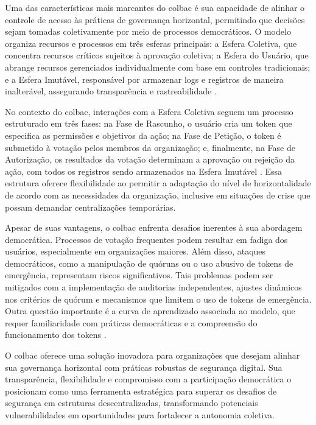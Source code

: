 Uma das características mais marcantes do \gls{colbac} é sua capacidade de
alinhar o controle de acesso às práticas de governança horizontal,
permitindo que decisões sejam tomadas coletivamente por meio de
processos democráticos. O modelo organiza recursos e processos em três
esferas principais: a Esfera Coletiva, que concentra recursos críticos
sujeitos à aprovação coletiva; a Esfera do Usuário, que abrange
recursos gerenciados individualmente com base em controles
tradicionais; e a Esfera Imutável, responsável por armazenar logs e
registros de maneira inalterável, assegurando transparência e
rastreabilidade \cite{Colbac}.

No contexto do \gls{colbac}, interações com a Esfera Coletiva seguem um
processo estruturado em três fases: na Fase de Rascunho, o usuário
cria um token que especifica as permissões e objetivos da ação; na
Fase de Petição, o token é submetido à votação pelos membros da
organização; e, finalmente, na Fase de Autorização, os resultados da
votação determinam a aprovação ou rejeição da ação, com todos os
registros sendo armazenados na Esfera Imutável \cite{Colbac}. Essa
estrutura oferece flexibilidade ao permitir a adaptação do nível de
horizontalidade de acordo com as necessidades da organização,
inclusive em situações de crise que possam demandar centralizações
temporárias.

Apesar de suas vantagens, o \gls{colbac} enfrenta desafios inerentes à sua
abordagem democrática. Processos de votação frequentes podem resultar
em fadiga dos usuários, especialmente em organizações maiores. Além
disso, ataques democráticos, como a manipulação de quóruns ou o uso
abusivo de tokens de emergência, representam riscos significativos.
Tais problemas podem ser mitigados com a implementação de auditorias
independentes, ajustes dinâmicos nos critérios de quórum e mecanismos
que limitem o uso de tokens de emergência. Outra questão importante é
a curva de aprendizado associada ao modelo, que requer familiaridade
com práticas democráticas e a compreensão do funcionamento dos tokens
\cite{Colbac}.

O \gls{colbac} oferece uma solução inovadora para organizações que desejam
alinhar sua governança horizontal com práticas robustas de segurança
digital. Sua transparência, flexibilidade e compromisso com a
participação democrática o posicionam como uma ferramenta estratégica
para superar os desafios de segurança em estruturas descentralizadas,
transformando potenciais vulnerabilidades em oportunidades para
fortalecer a autonomia coletiva.


